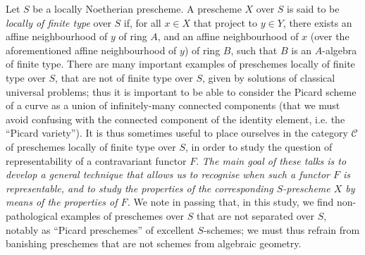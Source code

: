 \documentclass{article}
\theoremstyle{plain}
\theoremstyle{definition}
\newcommand{\cat}[1]{{\mathcal{#1}}}
\newcommand{\oldpage}[1]{\marginpar{\footnotesize$\Big\vert$ \textit{p.~#1}}}
\begin{document}
Let $S$ be a locally Noetherian prescheme.
A prescheme $X$ over $S$ is said to be
\oldpage{195-11}
\emph{locally of finite type} over $S$ if, for all $x\in X$ that project to $y\in Y$, there exists an affine neighbourhood of $y$ of ring $A$, and an affine neighbourhood of $x$ (over the aforementioned affine neighbourhood of $y$) of ring $B$, such that $B$ is an $A$-algebra of finite type.
There are many important examples of preschemes locally of finite type over $S$, that are not of finite type over $S$, given by solutions of classical universal problems;
thus it is important to be able to consider the Picard scheme of a curve as a union of infinitely-many connected components (that we must avoid confusing with the connected component of the identity element, i.e. the ``Picard variety'').
It is thus sometimes useful to place ourselves in the category $\cat{C}$ of preschemes locally of finite type over $S$, in order to study the question of representability of a contravariant functor $F$.
\emph{The main goal of these talks is to develop a general technique that allows us to recognise when such a functor $F$ is representable, and to study the properties of the corresponding $S$-prescheme $X$ by means of the properties of $F$.}
We note in passing that, in this study, we find non-pathological examples of preschemes over $S$ that are not separated over $S$, notably as ``Picard preschemes'' of excellent $S$-schemes;
we must thus refrain from banishing preschemes that are not schemes from algebraic geometry.
\end{document}
